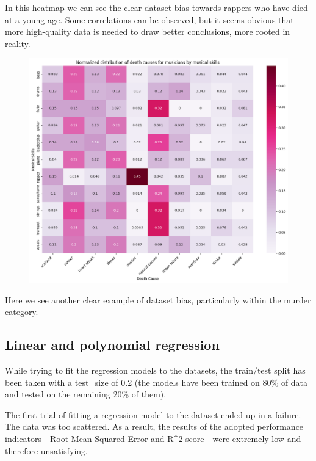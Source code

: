 \documentclass{article}
\begin{document}
In this heatmap we can see the clear dataset bias towards rappers who have died at a young age. Some correlations can be observed, but it seems obvious that more high-quality data is needed to draw better conclusions, more rooted in reality.


\begin{figure} [H]
    \centering
    \includegraphics[width=1\linewidth]{graph_images/heatmaps/heatmapextra.png}
    \label{fig:enter-label}
\end{figure}

Here we see another clear example of dataset bias, particularly within the murder category.



\clearpage
\subsection{Linear and polynomial regression}

While trying to fit the regression models to the datasets, the train/test split has been taken with a test\_size of 0.2 (the models have been trained on 80\% of data and tested on the remaining 20\% of them).

The first trial of fitting a regression model to the dataset ended up in a failure. The data was too scattered. As a result, the results of the adopted performance indicators - Root Mean Squared Error and R\textasciicircum2 score - were extremely low and therefore unsatisfying.
\end{document}
